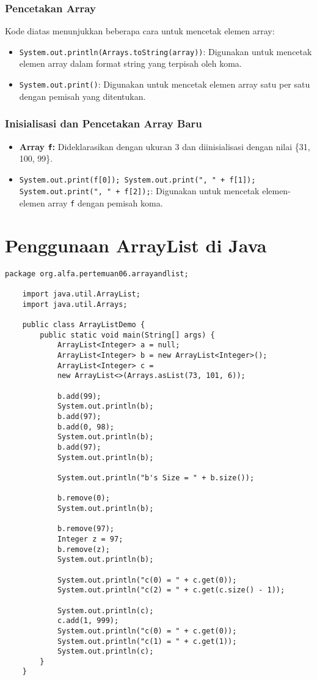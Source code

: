 \subsubsection{Pencetakan Array}

Kode diatas menunjukkan beberapa cara untuk mencetak elemen array:
\begin{itemize}
	\item \texttt{System.out.println(Arrays.toString(array))}: Digunakan untuk mencetak elemen array dalam format string yang terpisah oleh koma.
	\item \texttt{System.out.print()}: Digunakan untuk mencetak elemen array satu per satu dengan pemisah yang ditentukan.
\end{itemize}

\subsubsection{Inisialisasi dan Pencetakan Array Baru}

\begin{itemize}
	\item \textbf{Array \texttt{f}:} Dideklarasikan dengan ukuran 3 dan diinisialisasi dengan nilai \{31, 100, 99\}.
	\item \texttt{System.out.print(f[0]); System.out.print(", " + f[1]); System.out.print(", " + f[2]);}: Digunakan untuk mencetak elemen-elemen array \texttt{f} dengan pemisah koma.
\end{itemize}

\section{Penggunaan ArrayList di Java}

\begin{lstlisting}[style=JavaStyle]
	package org.alfa.pertemuan06.arrayandlist;
	
	import java.util.ArrayList;
	import java.util.Arrays;
	
	public class ArrayListDemo {
		public static void main(String[] args) {
			ArrayList<Integer> a = null;
			ArrayList<Integer> b = new ArrayList<Integer>();
			ArrayList<Integer> c = 
			new ArrayList<>(Arrays.asList(73, 101, 6));
			
			b.add(99);
			System.out.println(b);
			b.add(97);
			b.add(0, 98);
			System.out.println(b);
			b.add(97);
			System.out.println(b);
			
			System.out.println("b's Size = " + b.size());
			
			b.remove(0);
			System.out.println(b);
			
			b.remove(97);
			Integer z = 97;
			b.remove(z);
			System.out.println(b);
			
			System.out.println("c(0) = " + c.get(0));
			System.out.println("c(2) = " + c.get(c.size() - 1));
			
			System.out.println(c);
			c.add(1, 999);
			System.out.println("c(0) = " + c.get(0));
			System.out.println("c(1) = " + c.get(1));
			System.out.println(c);
		}
	}
\end{lstlisting}

